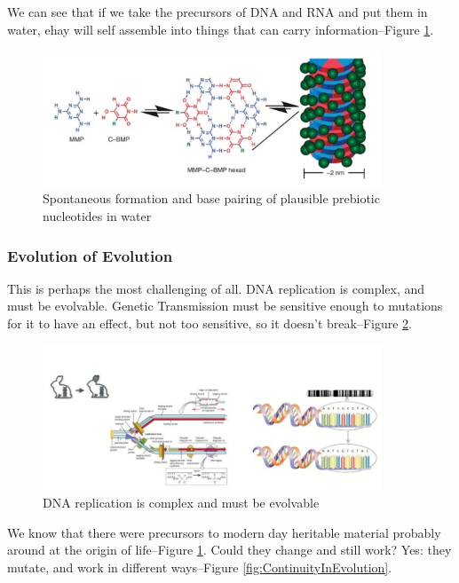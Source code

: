 \documentclass[]{article}
\begin{document}
We can see that if we take the precursors of DNA and RNA and put them in water, ehay will self assemble into things that can carry information--Figure \ref{fig:SpontaneousFormation}. 
\begin{figure}[H]
	\caption[Spontaneous formation and base pairing]{Spontaneous formation and base pairing of plausible prebiotic nucleotides in water\cite{cafferty2016spontaneous}}\label{fig:SpontaneousFormation}
	\includegraphics[width=0.9\textwidth]{SpontaneousFormation}
\end{figure}

\subsubsection{Evolution of Evolution}

This is perhaps the most challenging of all. DNA replication is complex, and must be evolvable. Genetic Transmission must be sensitive enough to mutations for it to have an effect, but not too sensitive, so it doesn't break--Figure \ref{fig:EvolutionOfEvolution}.
\begin{figure}[H]
	\caption{DNA replication is complex and must be evolvable}\label{fig:EvolutionOfEvolution}
	\includegraphics[width=0.9\textwidth]{EvolutionOfEvolution}
\end{figure}

We know that there were precursors to modern day heritable material probably around at the origin of life--Figure \ref{fig:SpontaneousFormation}. Could they change and still work? Yes: they mutate, and work in different ways--Figure \ref{fig:ContinuityInEvolution}.
\end{document}
